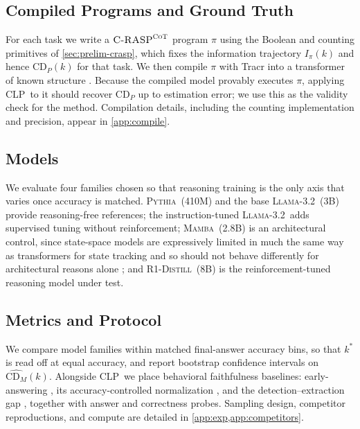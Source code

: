 \documentclass[11pt]{article}
\newcommand{\CDP}{\mathrm{CD}_{P}}
\newcommand{\CDM}{\mathrm{CD}_{M}}
\newcommand{\stepk}{k}
\newcommand{\CLP}{\textsc{CLP}}
\newcommand{\CRASPCoT}{\textsc{C-RASP}^{\textsc{CoT}}}
\newcommand{\Pythia}{\textsc{Pythia}}
\newcommand{\Llama}{\textsc{Llama-3.2}}
\newcommand{\Mamba}{\textsc{Mamba}}
\newcommand{\Rdistill}{\textsc{R1-Distill}}
\begin{document}
\subsection{Compiled Programs and Ground Truth}
\label{sec:setup-programs}

For each task we write a $\CRASPCoT$ program $\pi$ using the Boolean and
counting primitives of \cref{sec:prelim-crasp}, which fixes the information
trajectory $I_{\pi}(\stepk)$ and hence $\CDP(\stepk)$ for that task. We then
compile $\pi$ with Tracr into a transformer of known structure
\citep{DBLP:conf/nips/LindnerKFRMM23}. Because the compiled model provably
executes $\pi$, applying \CLP\ to it should recover $\CDP$ up to estimation
error; we use this as the validity check for the method. Compilation
details, including the counting implementation and precision, appear in
\cref{app:compile}.

\subsection{Models}
\label{sec:setup-models}

We evaluate four families chosen so that reasoning training is the only axis
that varies once accuracy is matched. \Pythia\ (410M) and the base \Llama\
(3B) provide reasoning-free references; the instruction-tuned \Llama\ adds
supervised tuning without reinforcement; \Mamba\ (2.8B) is an architectural
control, since state-space models are expressively limited in much the same way
as transformers for state tracking and so should not behave differently for
architectural reasons alone \citep{DBLP:conf/icml/MerrillPS24}; and \Rdistill\
(8B) is the reinforcement-tuned reasoning model under test.

\subsection{Metrics and Protocol}
\label{sec:setup-protocol}

We compare model families within matched final-answer accuracy bins, so that
$\stepk^{*}$ is read off at equal accuracy, and report bootstrap confidence
intervals on $\widehat{\CDM}(\stepk)$. Alongside \CLP\ we place behavioral
faithfulness baselines: early-answering
\citep{DBLP:journals/corr/abs-2307-13702}, its accuracy-controlled normalization
\citep{DBLP:journals/tmlr/BenthamSM24}, and the detection--extraction gap
\citep{DBLP:journals/corr/abs-2604-06613}, together with answer and correctness
probes. Sampling design, competitor reproductions, and compute are detailed in
\cref{app:exp,app:competitors}.
\end{document}
